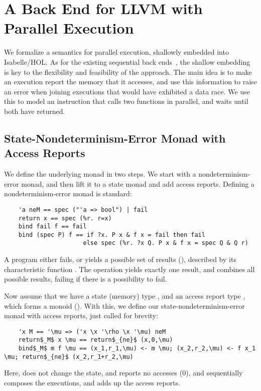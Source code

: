 \documentclass[a4paper,UKenglish,cleveref, autoref, thm-restate]{lipics-v2021}
\begin{document}
\section{A Back End for LLVM with Parallel Execution}\label{sec:parsem}
  We formalize a semantics for parallel execution, shallowly embedded into Isabelle/HOL.
  As for the existing sequential back ends~\cite{La15,La19-llvm}, the shallow embedding is key
  to the flexibility and feasibility of the approach.
  The main idea is to make an execution report the memory that it accesses,
  and use this information to raise an error when joining executions that
  would have exhibited a data race. We use this to model an instruction that
  calls two functions in parallel, and waits until both have returned.

  \subsection{State-Nondeterminism-Error Monad with Access Reports}\label{sec:monad}
  We define the underlying monad in two steps. We start with a nondeterminism-error monad,
  and then lift it to a state monad and add access reports.
  Defining a nondeterminism-error monad is standard:
  \begin{lstlisting}
    'a neM == spec ("'a => bool") | fail
    return x == spec (%r. r=x)
    bind fail f == fail
    bind (spec P) f == if ?x. P x & f x = fail then fail
                      else spec (%r. ?x Q. P x & f x = spec Q & Q r)
  \end{lstlisting}
  A program either fails, or yields a possible set of results (), described by its characteristic function .
  The  operation yields exactly one result, and  combines all possible results,
  failing if there is a possibility to fail.

  Now assume that we have a state (memory) type , and an access report type , which forms a monoid ().
  With this, we define our state-nondeterminism-error monad with access reports, just called  for brevity:
  \begin{lstlisting}
    'x M == '\mu => ('x \x '\rho \x '\mu) neM
    return$_M$ x \mu == return$_{ne}$ (x,0,\mu)
    bind$_M$ m f \mu == (x_1,r_1,\mu) <- m \mu; (x_2,r_2,\mu) <- f x_1 \mu; return$_{ne}$ (x_2,r_1+r_2,\mu)
  \end{lstlisting}
  Here,  does not change the state, and reports no accesses (\is$0$),
  and  sequentially composes the executions, and adds up the access reports.
\end{document}
